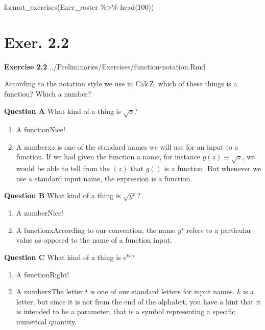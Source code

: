\documentclass[
  letterpaper,
  DIV=11,
  numbers=noendperiod,
  oneside]{article}
\newenvironment{Shaded}{\begin{snugshade}}{\end{snugshade}}
\newcommand{\DecValTok}[1]{\textcolor[rgb]{0.68,0.00,0.00}{#1}}
\newcommand{\FunctionTok}[1]{\textcolor[rgb]{0.28,0.35,0.67}{#1}}
\newcommand{\NormalTok}[1]{\textcolor[rgb]{0.00,0.23,0.31}{#1}}
\newcommand{\SpecialCharTok}[1]{\textcolor[rgb]{0.37,0.37,0.37}{#1}}
\providecommand{\tightlist}{%
  \setlength{\itemsep}{0pt}\setlength{\parskip}{0pt}}\usepackage{longtable,booktabs,array}
\begin{document}
\begin{multicols}{2}

\begin{Shaded}
\begin{Highlighting}[]
\FunctionTok{format\_exercises}\NormalTok{(Exer\_roster }\SpecialCharTok{\%\textgreater{}\%} \FunctionTok{head}\NormalTok{(}\DecValTok{100}\NormalTok{))}
\end{Highlighting}
\end{Shaded}

\hypertarget{exer.-2.2}{%
\section*{Exer. 2.2}\label{exer.-2.2}}

\textbf{Exercise 2.2} ../Preliminaries/Exercises/function-notation.Rmd

According to the notation style we use in CalcZ, which of these things
is a function? Which a number?

\textbf{Question A} What kind of a thing is \(\sqrt{z}\)?

\begin{enumerate}
\def\labelenumi{\roman{enumi}.}
\tightlist
\item
  {A function{Nice!~}}\\
\item
  {A number{x\(z\) is one of the standard names we will use for an
  input to a function. If we had given the function a name, for instance
  \(g(z) \equiv \sqrt{z}\), we would be able to tell from the \((z)\)
  that \(g()\) is a function. But whenever we use a standard input name,
  the expression is a function.}}
\end{enumerate}

\textbf{Question B} What kind of a thing is \(\sqrt{y^\star}\)?

\begin{enumerate}
\def\labelenumi{\roman{enumi}.}
\tightlist
\item
  {A number{Nice!~}}\\
\item
  {A function{xAccording to our convention, the name \(y^\star\)
  refers to a particular value as opposed to the name of a function
  input.}}
\end{enumerate}

\textbf{Question C} What kind of a thing is \(e^{k t}\)?

\begin{enumerate}
\def\labelenumi{\roman{enumi}.}
\tightlist
\item
  {A function{Right!~}}\\
\item
  {A number{xThe letter \(t\) is one of our standard letters for input
  names. \(k\) is a letter, but since it is not from the end of the
  alphabet, you have a hint that it is intended to be a parameter, that
  is a symbol representing a specific numerical quantity.}}
\end{enumerate}


\end{multicols}
\end{document}
